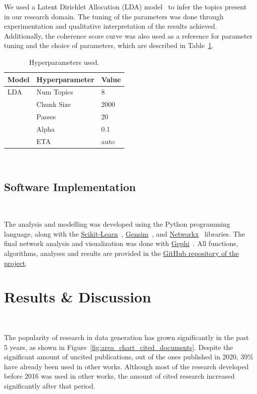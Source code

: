 \documentclass[parskip=full]{scrartcl}
\begin{document}
We used a Latent Dirichlet Allocation (LDA) model~\cite{Pritchard2000} to
infer the topics present in our research domain. The tuning of the parameters
was done through experimentation and qualitative interpretation of the results
achieved. Additionally, the coherence score curve was also used as a reference for
parameter tuning and the choice of parameters, which are described in
Table~\ref{tab:hyperparameters}. 

\begin{table}[H]
    \centering
    \begin{tabular}{lll}
        \toprule
        Model   &   Hyperparameter  &   Value \\
        \midrule
        LDA     &   Num Topics      &   8     \\
                &   Chunk Size      &   2000  \\
                &   Passes          &   20    \\
                &   Alpha           &   0.1   \\
                &   ETA             &   auto  \\
        \bottomrule
    \end{tabular}
    \caption{Hyperparameters used.}~\label{tab:hyperparameters}
\end{table}

\subsection{Software Implementation}~\label{sec:software_implementation}

The analysis and modelling was developed using the Python programming
language, along with the
\href{https://scikit-learn.org/stable/}{Scikit-Learn}~\cite{Pedregosa2011},
\href{https://radimrehurek.com/gensim/}{Gensim}~\cite{Rehurek2010}, and
\href{https://networkx.org/}{Networkx}~\cite{Hagberg2008} libraries. The final
network analysis and visualization was done with
\href{https://gephi.org/}{Gephi}~\cite{Bastian2009}. All functions,
algorithms, analyses and results are provided in the
\href{https://github.com/joaopfonseca/research}{GitHub repository of the
project}.

\section{Results \& Discussion}~\label{sec:results_discussion}

The popularity of research in data generation has grown significantly in the
past 5 years, as shown in Figure~\ref{fig:area_chart_cited_documents}. Despite
the significant amount of uncited publications, out of the ones published in
2020, 39\% have already been used in other works. Although most of the
research developed before 2016 was used in other works, the amount of cited
research increased significantly after that period.
\end{document}
